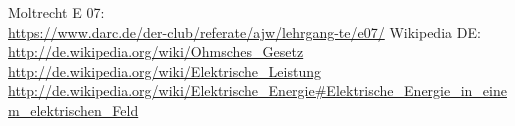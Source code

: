 \begin{thebibliography}{}
     Moltrecht E 07: \\
    \url{https://www.darc.de/der-club/referate/ajw/lehrgang-te/e07/}
      Wikipedia DE: \\
    \url{http://de.wikipedia.org/wiki/Ohmsches_Gesetz}\\
    \url{http://de.wikipedia.org/wiki/Elektrische_Leistung}\\
    \url{http://de.wikipedia.org/wiki/Elektrische_Energie#Elektrische_Energie_in_einem_elektrischen_Feld}\\

\end{thebibliography}


